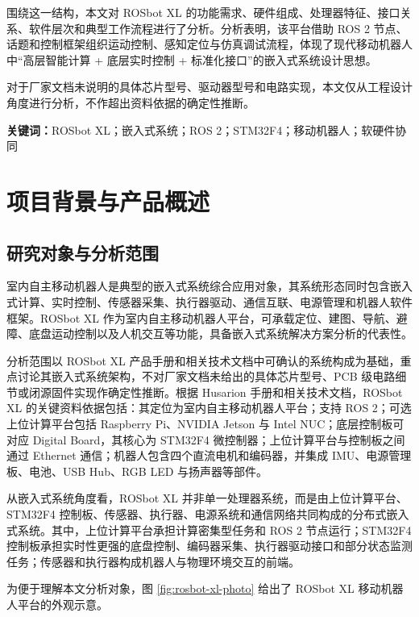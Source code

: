 \documentclass[UTF8,a4paper,12pt]{ctexrep}
\begin{document}
\noindent\hspace*{2em}围绕这一结构，本文对 ROSbot XL 的功能需求、硬件组成、处理器特征、接口关系、软件层次和典型工作流程进行了分析。分析表明，该平台借助 ROS 2 节点、话题和控制框架组织运动控制、感知定位与仿真调试流程，体现了现代移动机器人中“高层智能计算 + 底层实时控制 + 标准化接口”的嵌入式系统设计思想。

\noindent\hspace*{2em}对于厂家文档未说明的具体芯片型号、驱动器型号和电路实现，本文仅从工程设计角度进行分析，不作超出资料依据的确定性推断。

\noindent\textbf{关键词：}ROSbot XL；嵌入式系统；ROS 2；STM32F4；移动机器人；软硬件协同

\clearpage

\tableofcontents

\chapter{项目背景与产品概述}

\section{研究对象与分析范围}

室内自主移动机器人是典型的嵌入式系统综合应用对象，其系统形态同时包含嵌入式计算、实时控制、传感器采集、执行器驱动、通信互联、电源管理和机器人软件框架。ROSbot XL 作为室内自主移动机器人平台，可承载定位、建图、导航、避障、底盘运动控制以及人机交互等功能，具备嵌入式系统解决方案分析的代表性。

分析范围以 ROSbot XL 产品手册和相关技术文档中可确认的系统构成为基础，重点讨论其嵌入式系统架构，不对厂家文档未给出的具体芯片型号、PCB 级电路细节或闭源固件实现作确定性推断。根据 Husarion 手册和相关技术文档，ROSbot XL 的关键资料依据包括：其定位为室内自主移动机器人平台；支持 ROS 2；可选上位计算平台包括 Raspberry Pi、NVIDIA Jetson 与 Intel NUC；底层控制板可对应 Digital Board，其核心为 STM32F4 微控制器；上位计算平台与控制板之间通过 Ethernet 通信；机器人包含四个直流电机和编码器，并集成 IMU、电源管理板、电池、USB Hub、RGB LED 与扬声器等部件。

从嵌入式系统角度看，ROSbot XL 并非单一处理器系统，而是由上位计算平台、STM32F4 控制板、传感器、执行器、电源系统和通信网络共同构成的分布式嵌入式系统。其中，上位计算平台承担计算密集型任务和 ROS 2 节点运行；STM32F4 控制板承担实时性更强的底盘控制、编码器采集、执行器驱动接口和部分状态监测任务；传感器和执行器构成机器人与物理环境交互的前端。

为便于理解本文分析对象，图 \ref{fig:rosbot-xl-photo} 给出了 ROSbot XL 移动机器人平台的外观示意。
\end{document}
